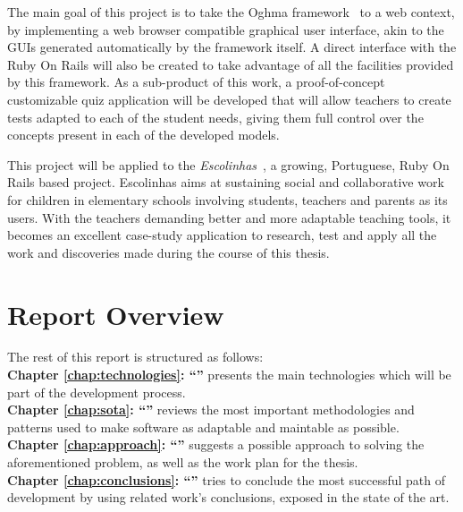 The main goal of this project is to take the Oghma framework~\cite{FCA09} to a web context, by implementing a web browser compatible graphical user interface, akin to the GUIs generated automatically by the framework itself. A direct interface with the Ruby On Rails will also be created to take advantage of all the facilities provided by this framework. As a sub-product of this work, a proof-of-concept customizable quiz application will be developed that will allow teachers to create tests adapted to each of the student needs, giving them full control over the concepts present in each of the developed models.

This project will be applied to the \textit{Escolinhas}~\cite{escolinhas}, a growing, Portuguese, Ruby On Rails based project. Escolinhas aims at sustaining social and collaborative work for children in elementary schools involving students, teachers and parents as its users. With the teachers demanding better and more adaptable teaching tools, it becomes an excellent case-study application to research, test and apply all the work and discoveries made during the course of this thesis.


\section{Report Overview}\label{sec:structure}

The rest of this report is structured as follows:\\

\textbf{Chapter \ref{chap:technologies}: ``'' } presents the main technologies which will be part of the development process.\\

\textbf{Chapter \ref{chap:sota}: ``'' } reviews the most important methodologies and patterns used to make software as adaptable and maintable as possible.\\

\textbf{Chapter \ref{chap:approach}: ``'' } suggests a possible approach to solving the aforementioned problem, as well as the work plan for the thesis.\\

\textbf{Chapter \ref{chap:conclusions}: ``'' } tries to conclude the most successful path of development by using related work’s conclusions, exposed in the state of the art. %

